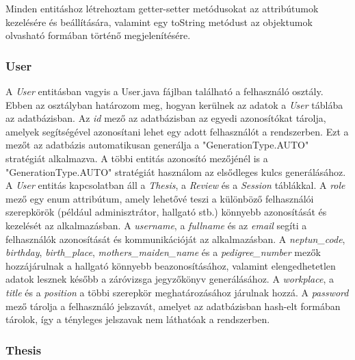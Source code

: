 Minden entitáshoz létrehoztam getter-setter metódusokat az attribútumok kezelésére és beállítására, valamint egy toString metódust az objektumok olvasható formában történő megjelenítésére.

\subsubsection{User}

A \textit{User} entitásban vagyis a User.java fájlban található a felhasználó osztály. Ebben az osztályban határozom meg, hogyan kerülnek az adatok a \textit{User} táblába az adatbázisban. Az \textit{id} mező az adatbázisban az egyedi azonosítókat tárolja, amelyek segítségével azonosítani lehet egy adott felhasználót a rendszerben. Ezt a mezőt az adatbázis automatikusan generálja a "GenerationType.AUTO" stratégiát alkalmazva. A többi entitás azonosító mezőjénél is a "GenerationType.AUTO" stratégiát használom az elsődleges kulcs generálásához. A \textit{User} entitás kapcsolatban áll a \textit{Thesis}, a \textit{Review} és a \textit{Session} táblákkal. A \textit{role} mező egy enum attribútum, amely lehetővé teszi a különböző felhasználói szerepkörök (például adminisztrátor, hallgató stb.) könnyebb azonosítását és kezelését az alkalmazásban. A \textit{username}, a \textit{fullname} és az \textit{email} segíti a felhasználók azonosítását és kommunikációját az alkalmazásban. A \textit{neptun\_code}, \textit{birthday}, \textit{birth\_place}, \textit{mothers\_maiden\_name} és a \textit{pedigree\_number} mezők hozzájárulnak a hallgató könnyebb beazonosításához, valamint elengedhetetlen adatok lesznek később a záróvizsga jegyzőkönyv generálásához. A \textit{workplace}, a \textit{title} és a \textit{position} a többi szerepkör meghatározásához járulnak hozzá. A \textit{password} mező tárolja a felhasználó jelszavát, amelyet az adatbázisban hash-elt formában tárolok, így a tényleges jelszavak nem láthatóak a rendszerben.


\subsubsection{Thesis}

